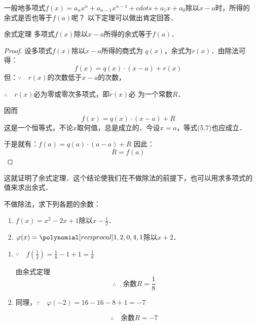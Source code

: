 一般地多项式$f(x)=a_n x^n +a_{n-1}x^{n-1}+cdots+a_1x+a_0$除以$x-a$时，所得的余式是否也等于$f(a)$呢？
以下定理可以做出肯定回答．

\begin{blk}{余式定理}
多项式$f(x)$除以$x-a$所得的余式等于$f(a)$．    
\end{blk}

\begin{proof}
    设多项式$f(x)$除以$x-a$所得的商式为
$q(x)$，余式为$r(x)$．由除法可得：
\[f (x) =q (x)\cdot  (x-a)+r(x)\]
但：$\because\quad r(x)$的次数低于$x-a$的次数，

$\therefore\quad r(x)$必为零或零次多项式，即$r(x)$必
    为一个常数$R$．

因而
\begin{equation}
    f (x) =q (x) \cdot  (x-a) +R
\end{equation}
这是一个恒等式，不论$x$取何值，总是成立的．今设$x=a$，等式(5.7)也应成立．

    于是就有：$f(a)=q(a)\cdot (a-a)+R$
因此： 
\begin{equation}
   R=f (a)  
\end{equation}
\end{proof}

    这就证明了余式定理．这个结论使我们在不做除法的前提下，也可以用求多项式的值来求出余式．


\begin{example}
  不做除法，求下列各题的余数：
  \begin{enumerate}
      \item $f(x)=x^2-2x+1$除以$x-\frac{1}{2}$．
      \item $\varphi(x)=\poly{1,2,0,4,1}$除以$x+2$．
  \end{enumerate}
\end{example}    
    


\begin{solution}
\begin{enumerate}
    \item $\because\quad f\left(\frac{1}{2}\right)=\frac{1}{8}-1+1=\frac{1}{8}$
    
    由余式定理
    \[\therefore\quad \text{余数}R=\frac{1}{8}\]

\item 同理，$\because\quad \varphi(-2)=16-16-8+1=-7$

\[\therefore\quad \text{余数}R=-7\]
\end{enumerate}

    
\end{solution}


